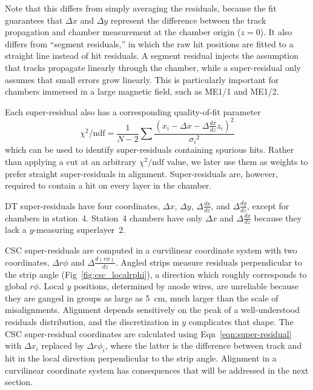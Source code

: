 \documentclass[12pt]{article}
\begin{document}
Note that this differs from simply averaging the residuals, because the
fit guarantees that $\Delta x$ and $\Delta y$ represent the difference
between the track propagation and chamber measurement at the chamber
origin ($z=0$).  It also differs from ``segment residuals,'' in which
the raw hit positions are fitted to a straight line instead of hit
residuals.  A segment residual injects the assumption that tracks
propagate linearly through the chamber, while a super-residual only
assumes that small errors grow linearly.  This is particularly
important for chambers immersed in a large magnetic field, such as
ME1/1 and ME1/2.

Each super-residual also has a corresponding quality-of-fit parameter
\begin{equation}
\chi^2/\mbox{ndf} = \frac{1}{N - 2} \sum \frac{\left(x_i - \Delta x - \Delta \frac{dx}{dz} z_i\right)^2}{{\sigma_i}^2}
\end{equation}
which can be used to identify super-residuals containing spurious
hits.  Rather than applying a cut at an arbitrary $\chi^2/\mbox{ndf}$
value, we later use them as weights to prefer straight super-residuals
in alignment.  Super-residuals are, however, required to contain a hit
on every layer in the chamber.

DT super-residuals have four coordinates, $\Delta x$, $\Delta y$,
$\Delta \frac{dx}{dz}$, and $\Delta \frac{dy}{dz}$, except for
chambers in station~4.  Station~4 chambers have only $\Delta x$ and
$\Delta \frac{dx}{dz}$ because they lack a $y$-measuring superlayer~2.

CSC super-residuals are computed in a curvilinear coordinate system
with two coordinates, $\Delta r\phi$ and $\Delta \frac{d(r\phi)}{dz}$.
Angled strips measure residuals perpendicular to the strip angle
(Fig~\ref{fig:csc_localrphi}), a direction which roughly corresponds
to global $r\phi$.  Local $y$ positions, determined by anode wires,
are unreliable because they are ganged in groups as large as 5~cm,
much larger than the scale of misalignments.  Alignment depends
sensitively on the peak of a well-understood residuals distribution,
and the discretization in $y$ complicates that shape.  The CSC
super-residual coordinates are calculated using
Eqn~\ref{eqn:super-residual} with $\Delta x_i$ replaced by $\Delta
r\phi_i$, where the latter is the difference between track and hit in
the local direction perpendicular to the strip angle.  Alignment in a
curvilinear coordinate system has consequences that will be addressed
in the next section.
\end{document}
